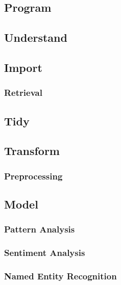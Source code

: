 \documentclass[]{book}
\begin{document}
\subsection{Program}\label{program-1}

\subsection{Understand}\label{understand-1}

\subsection{Import}\label{import}

\subsubsection{Retrieval}\label{retrieval}

\subsection{Tidy}\label{tidy}

\subsection{Transform}\label{transform}

\subsubsection{Preprocessing}\label{preprocessing}

\subsection{Model}\label{model}

\subsubsection{Pattern Analysis}\label{pattern-analysis}

\subsubsection{Sentiment Analysis}\label{sentiment-analysis}

\subsubsection{Named Entity Recognition}\label{named-entity-recognition}
\end{document}
